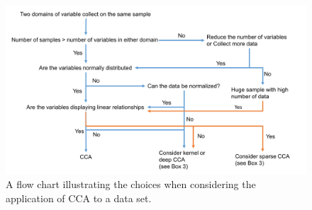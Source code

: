 \begin{figure}[H]
	\centering
	\includegraphics[width=1\textwidth]{cca/image/ccafig4.png}
	\caption{A flow chart illustrating the choices when considering the application of CCA to a data set.}
	\label{fig:methods:fig4}
\end{figure}

